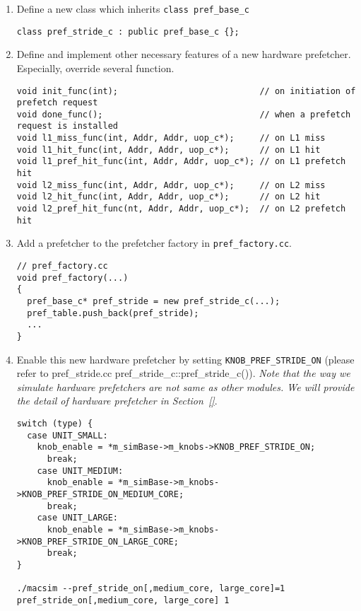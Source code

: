 \begin{enumerate}
  \item Define a new class which inherits \Verb+class pref_base_c+
\begin{Verbatim}
class pref_stride_c : public pref_base_c {};
\end{Verbatim}

  \item Define and implement other necessary features of a new
    hardware prefetcher. Especially, override several function.
\begin{Verbatim}
void init_func(int);                            // on initiation of prefetch request
void done_func();                               // when a prefetch request is installed
void l1_miss_func(int, Addr, Addr, uop_c*);     // on L1 miss
void l1_hit_func(int, Addr, Addr, uop_c*);      // on L1 hit
void l1_pref_hit_func(int, Addr, Addr, uop_c*); // on L1 prefetch hit
void l2_miss_func(int, Addr, Addr, uop_c*);     // on L2 miss
void l2_hit_func(int, Addr, Addr, uop_c*);      // on L2 hit
void l2_pref_hit_func(nt, Addr, Addr, uop_c*);  // on L2 prefetch hit
\end{Verbatim}

  \item Add a prefetcher to the prefetcher factory in \Verb+pref_factory.cc+.

\begin{Verbatim}
// pref_factory.cc
void pref_factory(...)
{
  pref_base_c* pref_stride = new pref_stride_c(...);
  pref_table.push_back(pref_stride);
  ...
}
\end{Verbatim}

  \item Enable this new hardware prefetcher by setting
    \Verb+KNOB_PREF_STRIDE_ON+ (please refer to pref\_stride.cc
    pref\_stride\_c::pref\_stride\_c()). \textit{Note that the way we
      simulate hardware prefetchers are not same as other modules. We
      will provide the detail of hardware prefetcher in
      Section~\ref{}}.
\begin{Verbatim}
switch (type) {
  case UNIT_SMALL:
    knob_enable = *m_simBase->m_knobs->KNOB_PREF_STRIDE_ON;
      break;
    case UNIT_MEDIUM:
      knob_enable = *m_simBase->m_knobs->KNOB_PREF_STRIDE_ON_MEDIUM_CORE;
      break;
    case UNIT_LARGE:
      knob_enable = *m_simBase->m_knobs->KNOB_PREF_STRIDE_ON_LARGE_CORE;
      break;
}

./macsim --pref_stride_on[,medium_core, large_core]=1
pref_stride_on[,medium_core, large_core] 1
\end{Verbatim}
\end{enumerate}
